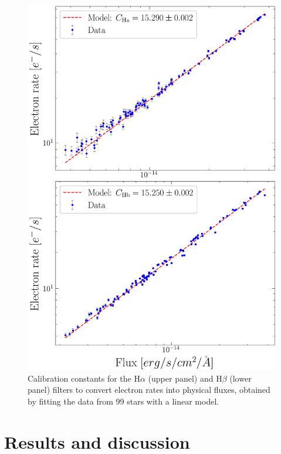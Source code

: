 \documentclass[fleqn,usenatbib]{mnras}
\begin{document}
\begin{figure}\centering
	\includegraphics[width=0.7\columnwidth]{Calib_tot.png}
    \caption{Calibration constants for the H$\alpha$ (upper panel) and H$\beta$ (lower panel) filters to convert electron rates into physical fluxes, obtained by fitting the data from 99 stars with a linear model.}
    \label{fig:Calib_tot}
\end{figure}



\section{Results and discussion}\label{sec:results}
\end{document}
